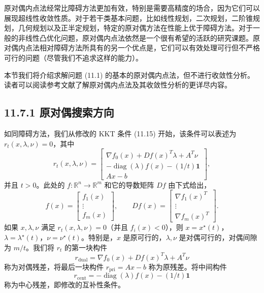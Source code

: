 \documentclass[UTF8, 12pt, fontset=fandol, oneside]{ctexart}
\begin{document}
原对偶内点法经常比障碍方法更加有效，特别是需要高精度的场合，因为它们可以展现超线性收敛性质。对于若干类基本问题，比如线性规划，二次规划，二阶锥规划，几何规划以及正半定规划，特定的原对偶方法在性能上优于障碍方法。对于一般的非线性凸优化问题，原对偶内点法依然是一个很有希望的活跃的研究课题。原对偶内点法相对障碍方法所具有的另一个优点是，它们可以有效处理可行但不严格可行的问题（尽管我们不追求这样的能力）。

本节我们将介绍求解问题 (11.1) 的基本的原对偶内点法，但不进行收敛性分析。读者可以阅读参考文献了解原对偶内点法及其收敛性分析的更详尽内容。

\subsection*{11.7.1 原对偶搜索方向}

如同障碍方法，我们从修改的 KKT 条件 (11.15) 开始，该条件可以表述为 $r_t(x,\lambda,\nu)=0$，其中
\begin{equation}
r_t(x,\lambda,\nu)=
\begin{bmatrix}
\nabla f_0(x)+Df(x)^T\lambda+A^T\nu\\
-\operatorname{diag}(\lambda)f(x)-(1/t)\mathbf{1}\\
Ax-b
\end{bmatrix},
\tag{11.53}
\end{equation}
并且 $t>0$。此处的 $f:\mathbb{R}^n\to\mathbb{R}^m$ 和它的导数矩阵 $Df$ 由下式给出，
\[
f(x)=
\begin{bmatrix}
f_1(x)\\
\vdots\\
f_m(x)
\end{bmatrix},\qquad
Df(x)=
\begin{bmatrix}
\nabla f_1(x)^T\\
\vdots\\
\nabla f_m(x)^T
\end{bmatrix}.
\]
如果 $x,\lambda,\nu$ 满足 $r_t(x,\lambda,\nu)=0$（并且 $f_i(x)<0$），则 $x=x^\star(t)$，$\lambda=\lambda^\star(t)$，$\nu=\nu^\star(t)$。特别是，$x$ 是原可行的，$\lambda,\nu$ 是对偶可行的，对偶间隙为 $m/t$。我们将 $r_t$ 的第一块构件
\[
r_{\mathrm{dual}}=\nabla f_0(x)+Df(x)^T\lambda+A^T\nu
\]
称为对偶残差，将最后一块构件 $r_{\mathrm{pri}}=Ax-b$ 称为原残差。将中间构件
\[
r_{\mathrm{cent}}=-\operatorname{diag}(\lambda)f(x)-(1/t)\mathbf{1}
\]
称为中心残差，即修改的互补性条件。
\end{document}
